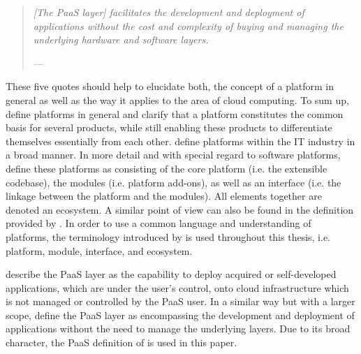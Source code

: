 \begin{quotation}{\slshape
[The \ac{PaaS} layer] facilitates the development and deployment of applications without the cost and complexity of buying and managing the underlying hardware and software layers.}
\vspace*{-7pt}
\begin{flushright}
	--- \citealp[p. 178]{Marston2011}
\end{flushright}
\end{quotation}

These five quotes should help to elucidate both, the concept of a platform in general as well as the way it applies to the area of cloud computing. To sum up, \citet[pp. 150-151]{Halman2003} define platforms in general and clarify that a platform constitutes the common basis for several products, while still enabling these products to differentiate themselves essentially from each other. \citet[p. 88]{Poel2007} define platforms within the \ac{IT} industry in a broad manner. In more detail and with special regard to software platforms, \citet[p. 676]{Tiwana2010} define these platforms as consisting of the core platform (i.e. the extensible codebase), the modules (i.e. platform add-ons), as well as an interface (i.e. the linkage between the platform and the modules). All elements together are denoted an ecosystem. A similar point of view can also be found in the definition provided by \citet[pp. 150-151]{Halman2003}. In order to use a common language and understanding of platforms, the terminology introduced by \citet{Tiwana2010} is used throughout this thesis, i.e. platform, module, interface, and ecosystem.  	

\citet[pp. 2-3]{Mell2011} describe the \ac{PaaS} layer as the capability to deploy acquired or self-developed applications, which are under the user's control, onto cloud infrastructure which is not managed or controlled by the \ac{PaaS} user. In a similar way but with a larger scope, \citet[p. 178]{Marston2011} define the \ac{PaaS} layer as encompassing the development and deployment of applications without the need to manage the underlying layers. Due to its broad character, the \ac{PaaS} definition of \citet[p. 178]{Marston2011} is used in this paper. 


